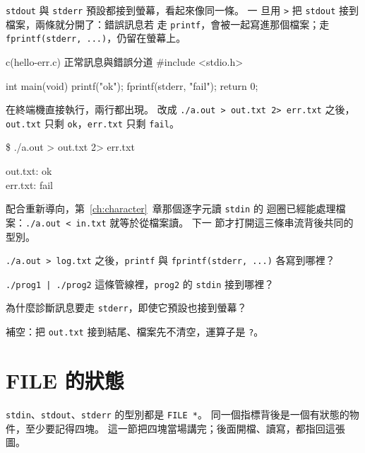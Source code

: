 \texttt{stdout} 與 \texttt{stderr} 預設都接到螢幕，看起來像同一條。 一
旦用 \texttt{>} 把 \texttt{stdout} 接到檔案，兩條就分開了：錯誤訊息若
走 \texttt{printf}，會被一起寫進那個檔案；走 \texttt{fprintf(stderr,
...)}，仍留在螢幕上。

\begin{example}[label=ex:fio-hello-err]{c}{(hello-err.c) 正常訊息與錯誤分道}
#include <stdio.h>

int main(void) {
    printf("ok\n");
    fprintf(stderr, "fail\n");
    return 0;
}
\end{example}

在終端機直接執行，兩行都出現。 改成 \texttt{./a.out > out.txt
2> err.txt} 之後，\texttt{out.txt} 只剩 \texttt{ok}，\texttt{err.txt}
只剩 \texttt{fail}。

\begin{center}
\begin{iotermbox}{\$ ./a.out > out.txt 2> err.txt}
\ttfamily\raggedright\noindent
out.txt: ok\\
err.txt: fail
\end{iotermbox}
\end{center}

配合重新導向，第~\ref{ch:character}~章那個逐字元讀 \texttt{stdin} 的
迴圈已經能處理檔案：\texttt{./a.out < in.txt} 就等於從檔案讀。 下一
節才打開這三條串流背後共同的型別。


\begin{drills}[label=drills:fio-stream]
\item \texttt{./a.out > log.txt} 之後，\texttt{printf} 與
\texttt{fprintf(stderr, ...)} 各寫到哪裡？
\item \texttt{./prog1 | ./prog2} 這條管線裡，\texttt{prog2} 的
\texttt{stdin} 接到哪裡？
\item 為什麼診斷訊息要走 \texttt{stderr}，即使它預設也接到螢幕？
\item 補空：把 \texttt{out.txt} 接到結尾、檔案先不清空，運算子是
\texttt{?}。
\end{drills}

\section{FILE 的狀態}
\label{sec:fio-state}

\texttt{stdin}、\texttt{stdout}、\texttt{stderr} 的型別都是
\texttt{FILE *}。 同一個指標背後是一個有狀態的物件，至少要記得四塊。
這一節把四塊當場講完；後面開檔、讀寫，都指回這張圖。

